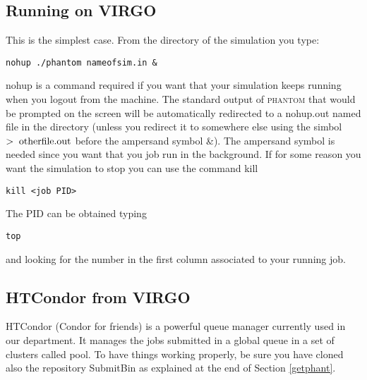 \documentclass[10pt,a4paper,twoside]{article} %
\begin{document}
\subsection{Running on VIRGO}

This is the simplest case. From the directory of the simulation you type:
\begin{verbatim}
nohup ./phantom nameofsim.in &
\end{verbatim}
nohup is a command required if you want that your simulation keeps running when you logout from the machine. The standard output of \textsc{phantom} that would be prompted on the screen will be automatically redirected to a nohup.out named file in the directory (unless you redirect it to somewhere else using the simbol $>\; {\rm otherfile.out}$ before the ampersand symbol \&). The ampersand symbol is needed since you want that you job run in the background.
If for some reason you want the simulation to stop you can use the command kill
\begin{verbatim}
kill <job PID>
\end{verbatim}
The PID can be obtained typing
\begin{verbatim}
top
\end{verbatim}
and looking for the number in the first column associated to your running job.

\subsection{HTCondor from VIRGO}\label{condvirgo}

HTCondor (Condor for friends) is a powerful queue manager currently used in our department. It manages the jobs submitted in a global queue in a set of clusters called pool. To have things working properly, be sure you have cloned also the repository SubmitBin as explained at the end of Section \ref{getphant}.
\end{document}

